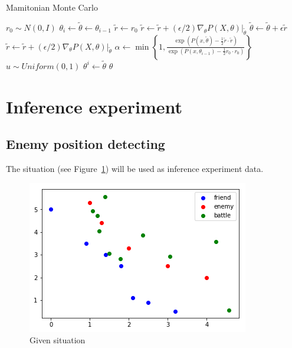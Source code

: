 \documentclass{article}
\begin{document}
\begin{algorithm}
\caption{Mamitonian Monte Carlo}
\begin{algorithmic}[1]
        \State $r_0 \sim N(0,I)$
        \State $\theta_i \gets \tilde{\theta} \gets \theta_{i-1}$
        \State $\tilde{r} \gets r_0$
            \State $\tilde{r} \gets \tilde{r} + (\epsilon/2) \nabla_\theta P(X,\theta)|_{\tilde{\theta}}$
            \State $\tilde{\theta} \gets \tilde{\theta} + \epsilon \tilde{r}$
            \State $\tilde{r} \gets \tilde{r} + (\epsilon/2) \nabla_\theta P(X,\theta)|_{\tilde{\theta}}$
        \EndFor
        \State $\alpha \gets \min \left\{ 1, \frac{\exp(P(x,\tilde{\theta})-\frac{1}{2}\tilde{r}\cdot\tilde{r})}{\exp(P(x,\theta_{i-1})-\frac{1}{2}r_0\cdot r_0)} \right\}$
        \State $u \sim Uniform(0,1)$
            \State $\theta^i \gets \tilde{\theta}$
        \EndIf
    \EndFor
    \State \Return $\theta$
\EndProcedure
\end{algorithmic}
\label{alg:hmc}
\end{algorithm}

\section{Inference experiment}

\subsection{Enemy position detecting}

The situation (see Figure~\ref{fig:expState}) will be used as inference experiment data.

\begin{figure}[h!]
\includegraphics[width=0.6\linewidth]{exp_state.png}
\caption{Given situation}
\label{fig:expState}
\end{figure}
\end{document}

